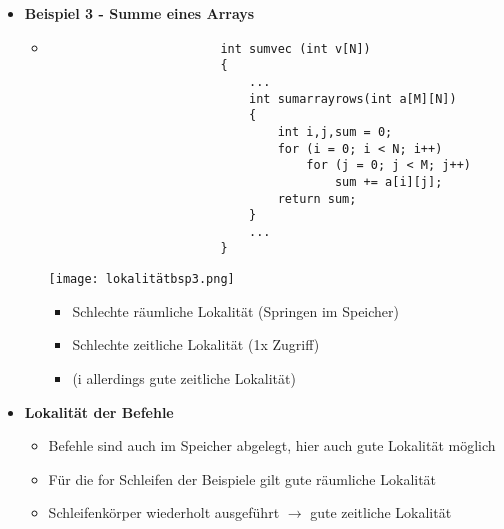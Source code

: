 \begin{itemize}
        \item \textbf{Beispiel 3 - Summe eines Arrays}
            \begin{itemize}
                \item[]
                    \begin{minipage}{0.35\textwidth}
                        \begin{verbatim}
                        int sumvec (int v[N])
                        {
                            ...
                            int sumarrayrows(int a[M][N])
                            {
                                int i,j,sum = 0;
                                for (i = 0; i < N; i++)
                                    for (j = 0; j < M; j++)
                                        sum += a[i][j];
                                return sum;
                            }
                            ...
                        }
                        \end{verbatim}
                    \end{minipage}
                    \begin{minipage}{0.5\textwidth}
                        \texttt{[image: lokalitätbsp3.png]}
                        \begin{itemize}
                            \item Schlechte räumliche Lokalität (Springen im Speicher)
                            \item Schlechte zeitliche Lokalität (1x Zugriff)
                            \item (i allerdings gute zeitliche Lokalität)
                        \end{itemize}
                    \end{minipage}
            \end{itemize}

        \item \textbf{Lokalität der Befehle}
            \begin{itemize}
                \item Befehle sind auch im Speicher abgelegt, hier auch gute Lokalität möglich
                \item Für die for Schleifen der Beispiele gilt gute räumliche Lokalität
                \item Schleifenkörper wiederholt ausgeführt $\rightarrow$ gute zeitliche Lokalität
            \end{itemize}


\end{itemize}
